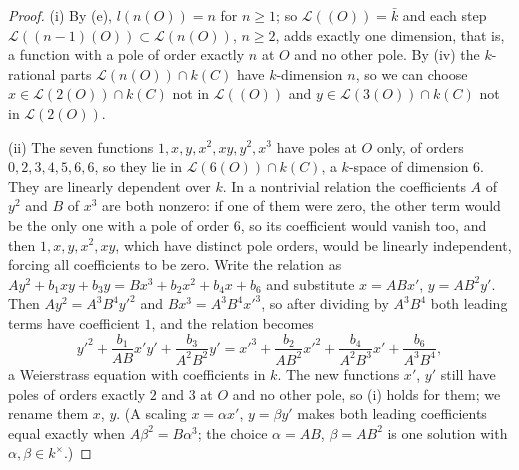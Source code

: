 \begin{proof}
(i) By (e), $l(n(O))=n$ for $n\ge1$; so $\mathcal L((O))=\bar k$ and each step $\mathcal L((n-1)(O))\subset\mathcal L(n(O))$, $n\ge2$, adds exactly
one dimension, that is, a function with a pole of order exactly $n$ at $O$ and no other pole. By (iv) the $k$-rational
parts $\mathcal L(n(O))\cap k(C)$ have $k$-dimension $n$, so we can choose $x\in\mathcal L(2(O))\cap k(C)$ not in $\mathcal L((O))$ and $y\in\mathcal L(3(O))\cap k(C)$ not in $\mathcal L(2(O))$.

(ii) The seven functions $1,x,y,x^2,xy,y^2,x^3$ have poles at $O$ only, of orders $0,2,3,4,5,6,6$, so they lie in $\mathcal L(6(O))\cap k(C)$, a $k$-space of
dimension $6$. They are linearly dependent over $k$. In a nontrivial relation the coefficients $A$ of $y^2$ and $B$ of $x^3$ are both nonzero: if one of them were
zero, the other term would be the only one with a pole of order $6$, so its coefficient would vanish too, and then $1,x,y,x^2,xy$, which have
distinct pole orders, would be linearly independent, forcing all coefficients to be zero. Write the relation as
$Ay^2+b_1xy+b_3y=Bx^3+b_2x^2+b_4x+b_6$ and substitute $x=ABx'$, $y=AB^2y'$. Then $Ay^2=A^3B^4y'^2$ and $Bx^3=A^3B^4x'^3$, so after dividing by
$A^3B^4$ both leading terms have coefficient $1$, and the relation becomes
\[
y'^2+\frac{b_1}{AB}x'y'+\frac{b_3}{A^2B^2}y'=x'^3+\frac{b_2}{AB^2}x'^2+\frac{b_4}{A^2B^3}x'+\frac{b_6}{A^3B^4},
\]
a Weierstrass equation with coefficients in $k$. The new functions $x'$, $y'$ still have poles of orders exactly $2$ and $3$ at $O$ and no other pole, so (i)
holds for them; we rename them $x$, $y$. (A scaling $x=\alpha x'$, $y=\beta y'$ makes both leading coefficients equal exactly when $A\beta^2=B\alpha^3$;
the choice $\alpha=AB$, $\beta=AB^2$ is one solution with $\alpha,\beta\in k^\times$.)


\end{proof}
